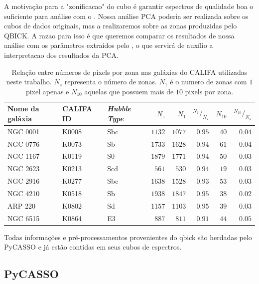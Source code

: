 A motivação para a "zonificacao"  do cubo é garantir espectros de qualidade boa o suficiente para análise com o
\starlight. Nossa análise PCA poderia ser realizada sobre os cubos de dados originais, mas a realizaremos sobre as zonas
produzidas pelo QBICK. A razao para isso é que queremos comparar os resultados de nossa análise com os parâmetros
extraídos pelo \starlight, o que servirá de auxílio a interpretacao dos resultados da PCA.

\begin{table}
	\caption[Relação de pixels e zonas em algumas galáxias do CALIFA]
	{Relação entre números de pixels por zona nas galáxias do CALIFA utilizadas
	neste trabalho. $N_z$ representa o número de zonas. $N_1$ é o numero de zonas
	com $1$ pixel apenas e $N_{10}$ aquelas que possuem mais de $10$ pixels por
	zona.}
	\begin{tabular}{l l l r r r r r}
		Nome da galáxia & CALIFA ID & {\em Hubble Type} & $N_z$ & $N_{1}$ &
		${}^{N_1}/_{N_z}$ & $N_{10}$ & ${}^{N_{10}}/_{N_z}$
		\\
		\midrule
		NGC 0001 & K0008 & Sbc & $1132$ & $1077$ & $0.95$ & $40$ & $0.04$ \\
		NGC 0776 & K0073 & Sb & $1733$ & $1628$ & $0.94$ & $61$ & $0.04$ \\
		NGC 1167 & K0119 & S0 & $1879$ & $1771$ & $0.94$ & $50$ & $0.03$ \\
		NGC 2623 & K0213 & Scd & $561$ & $530$ & $0.94$ & $19$ & $0.03$ \\
		NGC 2916 & K0277 & Sbc & $1638$ & $1528$ & $0.93$ & $53$ & $0.03$ \\
		NGC 4210 & K0518 & Sb & $1938$ & $1847$ & $0.95$ & $38$ & $0.02$ \\
		ARP 220 & K0802 & Sd & $1157$ & $1103$ & $0.95$ & $39$ & $0.03$ \\
		NGC 6515 & K0864 & E3 & $887$ & $811$ & $0.91$ & $44$ & $0.05$ \\
	\end{tabular}
	\label{tab:pixelZones}
\end{table}

Todas informações e pré-processamentos provenientes do {\sc qbick} são herdadas pelo PyCASSO e já estão contidas em seus
cubos de espectros.

\subsection{PyCASSO}

